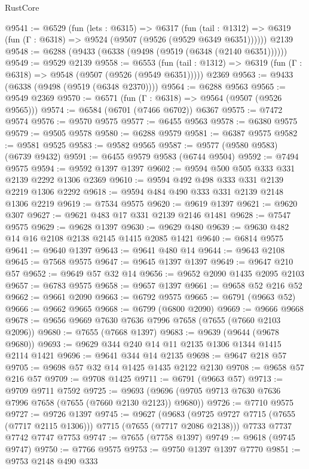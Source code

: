 \begin{lexlean}{RustCore}
\begin{coremodule}
@9541 := @6529
    (fun (lets : @6315) =>
    @6317
      (fun (tail : @1312) => @6319 (fun (Γ : @6318) => @9524 (@9507 (@9526 (@9529 @6349 @6351))))))
    @2139
@9548 := @6288 (@9433 (@6338 (@9498 (@9519 (@6348 (@2140 @6351))))))
@9549 := @9529 @2139
@9558 := @6553
    (fun (tail : @1312) => @6319 (fun (Γ : @6318) => @9548 (@9507 (@9526 (@9549 @6351)))))
    @2369
@9563 := @9433 (@6338 (@9498 (@9519 (@6348 @2370))))
@9564 := @6288 @9563
@9565 := @9549 @2369
@9570 := @6571 (fun (Γ : @6318) => @9564 (@9507 (@9526 @9565)))
@9574 := @6584 (@6701 (@7466 @6702)) @6367
@9575 := @7472 @9574
@9576 := @9570 @9575
@9577 := @6455 @9563
@9578 := @6380 @9575
@9579 := @9505 @9578
@9580 := @6288 @9579
@9581 := @6387 @9575
@9582 := @9581 @9525
@9583 := @9582 @9565
@9587 := @9577 (@9580 @9583) (@6739 @9432)
@9591 := @6455 @9579 @9583 (@6744 @9504)
@9592 := @7494 @9575
@9594 := @9592 @1397 @1397
@9602 := @9594 @500 @505 @333 @331 @2139 @2292 @1306 @2369
@9610 := @9594 @492 @498 @333 @331 @2139 @2219 @1306 @2292
@9618 := @9594 @484 @490 @333 @331 @2139 @2148 @1306 @2219
@9619 := @7534 @9575
@9620 := @9619 @1397
@9621 := @9620 @307
@9627 := @9621 @483 @17 @331 @2139 @2146 @1481
@9628 := @7547 @9575
@9629 := @9628 @1397
@9630 := @9629 @480
@9639 := @9630 @482 @14 @16 @2108 @2138 @2145 @1415 @2085 @1421
@9640 := @6814 @9575
@9641 := @9640 @1397
@9643 := @9641 @480 @14
@9644 := @9643 @2108
@9645 := @7568 @9575
@9647 := @9645 @1397 @1397
@9649 := @9647 @210 @57
@9652 := @9649 @57 @32 @14
@9656 := @9652 @2090 @1435 @2095 @2103
@9657 := @6783 @9575
@9658 := @9657 @1397
@9661 := @9658 @52 @216 @52
@9662 := @9661 @2090
@9663 := @6792 @9575
@9665 := @6791 (@9663 @52)
@9666 := @9662 @9665
@9668 := @6799 (@6800 @2090)
@9669 := @9666 @9668
@9678 := @9656 @9669 @7630 @7636 @7996 @7658 (@7655 (@7660 @2103 @2096))
@9680 := @7655 (@7668 @1397)
@9683 := @9639 (@9644 (@9678 @9680))
@9693 := @9629 @344 @240 @14 @11 @2135 @1306 @1344 @1415 @2114 @1421
@9696 := @9641 @344 @14 @2135
@9698 := @9647 @218 @57
@9705 := @9698 @57 @32 @14 @1425 @1435 @2122 @2130
@9708 := @9658 @57 @216 @57
@9709 := @9708 @1425
@9711 := @6791 (@9663 @57)
@9713 := @9709 @9711 @7592
@9725 := @9693 (@9696 (@9705 @9713 @7630 @7636 @7996 @7658 (@7655 (@7660 @2130 @2123)) @9680))
@9726 := @7710 @9575
@9727 := @9726 @1397
@9745 := @9627
    (@9683 (@9725 @9727 @7715 (@7655 (@7717 @2115 @1306))) @7715 (@7655 (@7717 @2086 @2138)))
    @7733
    @7737
    @7742
    @7747
    @7753
@9747 := @7655 (@7758 @1397)
@9749 := @9618 (@9745 @9747)
@9750 := @7766 @9575
@9753 := @9750 @1397 @1397 @7770
@9851 := @9753
    @2148
    @490
    @333

\end{coremodule}
\end{lexlean}
